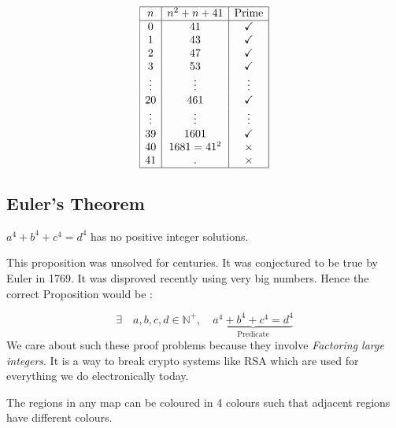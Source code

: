 \[
    \begin{array}{|c|c|c|}
        \hline
        n      & n^2 + n + 41 & \text{Prime} \\
        \hline
        0      & 41           & \checkmark   \\
        1      & 43           & \checkmark   \\
        2      & 47           & \checkmark   \\
        3      & 53           & \checkmark   \\
        \vdots & \vdots       & \vdots       \\
        20     & 461          & \checkmark   \\
        \vdots & \vdots       & \vdots       \\
        39     & 1601         & \checkmark   \\
        40     & 1681=41^2    & \times       \\
        41     & .            & \times       \\
        \hline
    \end{array}
\]

\subsection{Euler's Theorem}

\begin{example}
    $a^4 + b^4 + c^4 = d^4$ has no positive integer solutions.
\end{example}

This proposition was unsolved for centuries. It was conjectured to be true by Euler in 1769. It was disproved recently using very big numbers. Hence the correct Proposition would be :

$$
    \exists \quad a, b, c, d \in \mathbb{N}^+, \quad \underbrace{a^4 + b^4 + c^4 = d^4}_{\text{Predicate}}
$$
We care about such these proof problems because they involve \textit{Factoring large integers}. It is a way to break crypto systems like RSA which are used for everything we do electronically today.

\begin{example}
    The regions in any map can be coloured in 4 colours such that adjacent regions have different colours.
\end{example}
